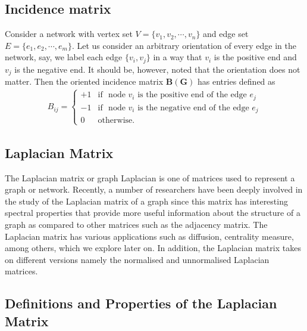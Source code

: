 \documentclass[10pt,a4paper]{article}
\begin{document}
\subsection{Incidence matrix}
	Consider a network with vertex set $V=\{v_1,v_2, \cdots,v_n\}$ and edge set $E =\{e_1,e_2,\cdots,e_m \}$. Let us consider an arbitrary orientation of every edge in the network, say, we label each edge $\{v_i,v_j\}$ in a way that $v_i$ is the positive end and $v_j$ is the negative end. It should be, however, noted that the orientation does not matter. Then the oriented incidence matrix $\mathbf{B(G)}$ has entries defined as
	\begin{eqnarray}
	B_{ij} = \begin{cases} +1 &\mbox{if } \text{ node $v_i$ is the positive end of the edge } e_j \\
	-1 &\mbox{if }  \text{ node $v_i$ is the negative end of the edge } e_j\\
	0 & \text{otherwise}.
	\end{cases}
	\end{eqnarray}

\subsection{Laplacian Matrix}
The Laplacian matrix or graph Laplacian is one of matrices used to represent a graph or network. Recently, a number of researchers have been deeply involved in the study of the Laplacian matrix of a graph since this matrix has interesting spectral properties that provide more useful information about the structure of a graph as compared to other matrices such as the adjacency matrix. The Laplacian matrix has various applications such as diffusion, centrality measure, among others, which we explore later on. In addition, the Laplacian matrix takes on different versions namely the normalised and unnormalised Laplacian matrices.

\subsection{Definitions and Properties of the Laplacian Matrix}
\end{document}

